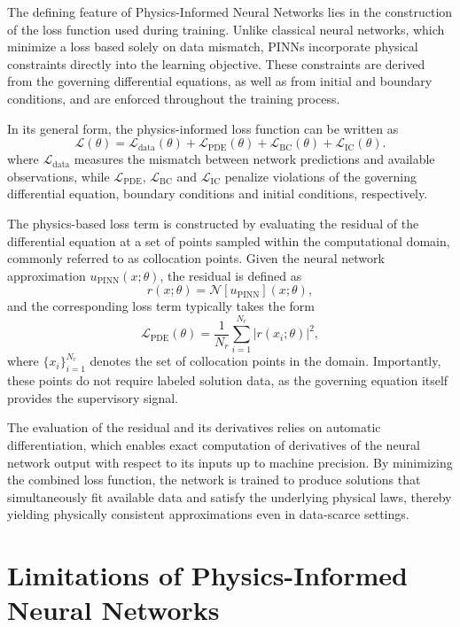 \documentclass[final,1p,times]{elsarticle}
\theoremstyle{definition}
\begin{document}
The defining feature of Physics-Informed Neural Networks lies in the construction of the loss function used during training. Unlike classical neural networks, which minimize a loss based solely on data mismatch, PINNs incorporate physical constraints directly into the learning objective. These constraints are derived from the governing differential equations, as well as from initial and boundary conditions, and are enforced throughout the training process.

In its general form, the physics-informed loss function can be written as
\[
\mathcal{L}(\theta) =
\mathcal{L}_{\mathrm{data}}(\theta)
+ \mathcal{L}_{\mathrm{PDE}}(\theta)
+ \mathcal{L}_{\mathrm{BC}}(\theta)
+ \mathcal{L}_{\mathrm{IC}}(\theta).
\]
where $\mathcal{L}_{\mathrm{data}}$ measures the mismatch between network predictions and available observations, while $\mathcal{L}_{\mathrm{PDE}}$, $\mathcal{L}_{\mathrm{BC}}$ and $\mathcal{L}_{\mathrm{IC}}$ penalize violations of the governing differential equation, boundary conditions and initial conditions, respectively.

The physics-based loss term is constructed by evaluating the residual of the differential equation at a set of points sampled within the computational domain, commonly referred to as collocation points. Given the neural network approximation $u_{\mathrm{PINN}}(x;\theta)$, the residual is defined as
\[
r(x;\theta) = \mathcal{N}[u_{\mathrm{PINN}}](x;\theta),
\]
and the corresponding loss term typically takes the form
\[
\mathcal{L}_{\mathrm{PDE}}(\theta)
= \frac{1}{N_r} \sum_{i=1}^{N_r} \left| r(x_i;\theta) \right|^2,
\]
where $\{x_i\}_{i=1}^{N_r}$ denotes the set of collocation points in the domain. Importantly, these points do not require labeled solution data, as the governing equation itself provides the supervisory signal.

The evaluation of the residual and its derivatives relies on automatic differentiation, which enables exact computation of derivatives of the neural network output with respect to its inputs up to machine precision. By minimizing the combined loss function, the network is trained to produce solutions that simultaneously fit available data and satisfy the underlying physical laws, thereby yielding physically consistent approximations even in data-scarce settings.

\section{Limitations of Physics-Informed Neural Networks}
\end{document}
